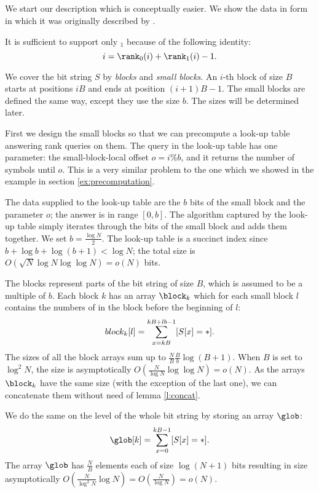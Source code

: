 \subsection{\rank}\label{ss:rank}

We start our description \rank{} which is conceptually easier.
We show the data in form in which it was originally described by \cite{jacobson1988succinct}.

It is sufficient to support only \rank$_1$ because of the following identity:
$$ i = \rank_0(i) + \rank_1(i) - 1. $$

\bigbreak

We cover the bit string $S$ by \emph{blocks} and \emph{small blocks}.
An $i$-th block of size $B$ starts at positions $i B$ and ends at position $(i + 1) B - 1$.
The small blocks are defined the same way, except they use the size $b$.
The sizes will be determined later.

First we design the small blocks so that we can precompute a look-up table \rank{} answering rank queries on them.
The query in the look-up table has one parameter: the small-block-local offset $o = i \% b$, and it returns the number of symbols \ph{} until $o$.
This is a very similar problem to the one which we showed in the example in section \ref{ex:precomputation}.

The data supplied to the look-up table are the $b$ bits of the small block and the parameter $o$; the answer is in range $[0, b]$.
The algorithm captured by the look-up table simply iterates through the bits of the small block and adds them together.
We set $b = \frac{\log N}{2}$.
The look-up table is a succinct index since $b + \log b + \log (b + 1) < \log N$; the total size is $O(\sqrt{N} \log N \log \log N) = o(N)$ bits.

The blocks represent parts of the bit string of size $B$, which is assumed to be a multiple of $b$.
Each block $k$ has an array $\block_k$ which for each small block $l$ contains the numbers of \ph{} in the block before the beginning of $l$:
$$ block_k[l] = \sum_{x = k B}^{k B + l b - 1} [S[x] = \ph]. $$
The sizes of all the block arrays sum up to $\frac{N}{B} \frac{B}{b} \log (B + 1)$.
When $B$ is set to $\log^2 N$, the size is asymptotically $O(\frac{N}{\log N} \log \log N) = o(N)$.
As the arrays $\block_k$ have the same size (with the exception of the last one), we can concatenate them without need of lemma \ref{l:concat}.

We do the same on the level of the whole bit string by storing an array $\glob$:
$$ \glob[k] = \sum_{x = 0}^{k B - 1} [S[x] = \ph]. $$
The array $\glob$ has $\frac{N}{B}$ elements each of size $\log (N+1)$ bits resulting in size asymptotically $O(\frac{N}{\log^2 N} \log{N}) = O(\frac{N}{\log N}) = o(N)$.

